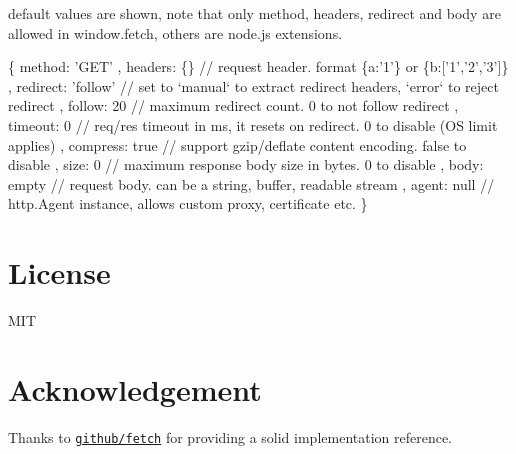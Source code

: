 default values are shown, note that only {\ttfamily method}, {\ttfamily headers}, {\ttfamily redirect} and {\ttfamily body} are allowed in {\ttfamily window.\+fetch}, others are node.\+js extensions.


\begin{DoxyCode}
\{
    method: 'GET'
    , headers: \{\}        // request header. format \{a:'1'\} or \{b:['1','2','3']\}
    , redirect: 'follow' // set to `manual` to extract redirect headers, `error` to reject redirect
    , follow: 20         // maximum redirect count. 0 to not follow redirect
    , timeout: 0         // req/res timeout in ms, it resets on redirect. 0 to disable (OS limit applies)
    , compress: true     // support gzip/deflate content encoding. false to disable
    , size: 0            // maximum response body size in bytes. 0 to disable
    , body: empty        // request body. can be a string, buffer, readable stream
    , agent: null        // http.Agent instance, allows custom proxy, certificate etc.
\}
\end{DoxyCode}


\section*{License}

M\+IT

\section*{Acknowledgement}

Thanks to \href{https://github.com/github/fetch}{\tt github/fetch} for providing a solid implementation reference. 